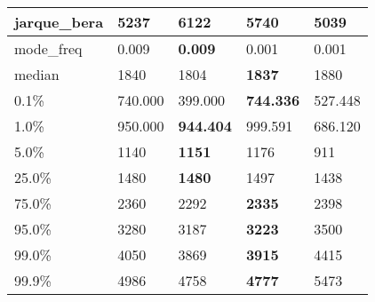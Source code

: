 \begin{table}[H]
\begin{tabular}{|l|m{10em}|m{10em}|m{10em}|m{10em}|}
\hline jarque\_bera & 5237 & \cellcolor[rgb]{0.9, 0.54, 0.52} 6122 & 5740 & \bfseries 5039 \\
\hline mode\_freq & 0.009 & \bfseries 0.009 & \cellcolor[rgb]{0.9, 0.54, 0.52} 0.001 & 0.001 \\
\hline median & 1840 & 1804 & \bfseries 1837 & \cellcolor[rgb]{0.9, 0.54, 0.52} 1880 \\
\hline 0.1\% & 740.000 & \cellcolor[rgb]{0.9, 0.54, 0.52} 399.000 & \bfseries 744.336 & 527.448 \\
\hline 1.0\% & 950.000 & \bfseries 944.404 & 999.591 & \cellcolor[rgb]{0.9, 0.54, 0.52} 686.120 \\
\hline 5.0\% & 1140 & \bfseries 1151 & 1176 & \cellcolor[rgb]{0.9, 0.54, 0.52} 911 \\
\hline 25.0\% & 1480 & \bfseries 1480 & 1497 & \cellcolor[rgb]{0.9, 0.54, 0.52} 1438 \\
\hline 75.0\% & 2360 & \cellcolor[rgb]{0.9, 0.54, 0.52} 2292 & \bfseries 2335 & 2398 \\
\hline 95.0\% & 3280 & 3187 & \bfseries 3223 & \cellcolor[rgb]{0.9, 0.54, 0.52} 3500 \\
\hline 99.0\% & 4050 & 3869 & \bfseries 3915 & \cellcolor[rgb]{0.9, 0.54, 0.52} 4415 \\
\hline 99.9\% & 4986 & 4758 & \bfseries 4777 & \cellcolor[rgb]{0.9, 0.54, 0.52} 5473 \\
\hline
\end{tabular}
\end{table}
